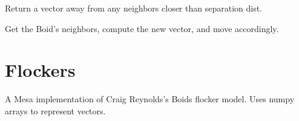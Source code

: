 \documentclass[letterpaper,10pt,english]{sphinxmanual}
\begin{document}
\begin{fulllineitems}
\begin{fulllineitems}
\end{fulllineitems}


\begin{fulllineitems}
\label{\detokenize{index:examples.boid_flockers.boid_flockers.boid.Boid.separate}}
Return a vector away from any neighbors closer than separation dist.

\end{fulllineitems}


\begin{fulllineitems}
\label{\detokenize{index:examples.boid_flockers.boid_flockers.boid.Boid.step}}
Get the Boid’s neighbors, compute the new vector, and move accordingly.

\end{fulllineitems}


\end{fulllineitems}

\label{\detokenize{index:module-examples.boid_flockers.boid_flockers.model}}

\chapter{Flockers}
\label{\detokenize{index:flockers}}
A Mesa implementation of Craig Reynolds’s Boids flocker model.
Uses numpy arrays to represent vectors.
\end{document}

